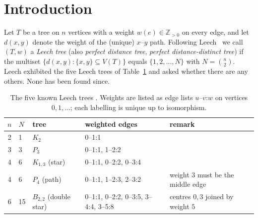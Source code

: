 \documentclass[11pt,a4paper]{article}
\theoremstyle{plain}
\theoremstyle{remark}
\newcommand{\Z}{\mathbb{Z}}
\newcommand{\bin}[2]{\binom{#1}{#2}}
\begin{document}
\section{Introduction}\label{sec:intro}

Let $T$ be a tree on $n$ vertices with a weight $w(e)\in\Z_{>0}$ on every edge,
and let $d(x,y)$ denote the weight of the (unique) $x$--$y$ path.  Following
Leech~\cite{Leech1975} we call $(T,w)$ a \emph{Leech tree} (also \emph{perfect
distance tree}, \emph{perfect distance-distinct tree}) if the multiset
$\{d(x,y):\{x,y\}\subseteq V(T)\}$ equals $\{1,2,\dots,N\}$ with $N=\bin n2$.
Leech exhibited the five Leech trees of Table~\ref{tab:known} and asked whether
there are any others.  None has been found since.

\begin{table}[ht]
\centering
\caption{The five known Leech trees \cite{Leech1975}.  Weights are listed as
edge lists $u$--$v$:$w$ on vertices $0,1,\dots$; each labelling is unique up to
isomorphism.}
\label{tab:known}
\small
\begin{tabular}{@{}cllll@{}}
\toprule
$n$ & $N$ & tree & weighted edges & remark\\
\midrule
2 & 1  & $K_2$            & 0--1:1 & \\
3 & 3  & $P_3$            & 0--1:1, 1--2:2 & \\
4 & 6  & $K_{1,3}$ (star) & 0--1:1, 0--2:2, 0--3:4 & \\
4 & 6  & $P_4$ (path)     & 0--1:1, 1--2:3, 2--3:2 & weight 3 must be the middle edge\\
6 & 15 & $B_{2,2}$ (double star) & 0--1:1, 0--2:2, 0--3:5, 3--4:4, 3--5:8 & centres $0,3$ joined by weight $5$\\
\bottomrule
\end{tabular}
\end{table}
\end{document}
